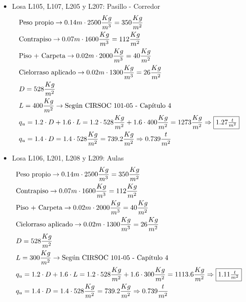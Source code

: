 \begin{enumerate}
\begin{itemize}
\item Losa L105, L107, L205 y L207: Pasillo - Corredor
\begin{align*}
& \text{Peso propio} \rightarrow 0.14m \cdot 2500 \frac{Kg}{m^3} = 350 \frac{Kg}{m^2}\\
& \text{Contrapiso} \rightarrow 0.07m \cdot 1600 \frac{Kg}{m^3} = 112 \frac{Kg}{m^2}\\
& \text{Piso + Carpeta} \rightarrow 0.02m \cdot 2000 \frac{Kg}{m^3} = 40 \frac{Kg}{m^2}\\
& \text{Cielorraso aplicado} \rightarrow  0.02m \cdot 1300 \frac{Kg}{m^3} = 26 \frac{Kg}{m^2}\\
& D = 528 \frac{Kg}{m^2}\\
& L = 400 \frac{Kg}{m^2} \rightarrow \text{Según CIRSOC 101-05 - Capítulo 4}\\
& q_u = 1.2 \cdot D + 1.6 \cdot L = 1.2 \cdot 528 \frac{Kg}{m^2} + 1.6 \cdot 400 \frac{Kg}{m^2} = 1273 \frac{Kg}{m^2} \Rightarrow \framebox{$1.27 \frac{t}{m^2}$} \\
& q_u = 1.4 \cdot D = 1.4 \cdot 528 \frac{Kg}{m^2} = 739.2 \frac{Kg}{m^2} \Rightarrow 0.739 \frac{t}{m^2}
\end{align*}

\item Losa L106, L201, L208 y L209: Aulas
\begin{align*}
& \text{Peso propio} \rightarrow 0.14m \cdot 2500 \frac{Kg}{m^3} = 350 \frac{Kg}{m^2}\\
& \text{Contrapiso} \rightarrow 0.07m \cdot 1600 \frac{Kg}{m^3} = 112 \frac{Kg}{m^2}\\
& \text{Piso + Carpeta} \rightarrow 0.02m \cdot 2000 \frac{Kg}{m^3} = 40 \frac{Kg}{m^2}\\
& \text{Cielorraso aplicado} \rightarrow  0.02m \cdot 1300 \frac{Kg}{m^3} = 26 \frac{Kg}{m^2}\\
& D = 528 \frac{Kg}{m^2}\\
& L = 300 \frac{Kg}{m^2} \rightarrow \text{Según CIRSOC 101-05 - Capítulo 4}\\
& q_u = 1.2 \cdot D + 1.6 \cdot L = 1.2 \cdot 528 \frac{Kg}{m^2} + 1.6 \cdot 300 \frac{Kg}{m^2} = 1113.6 \frac{Kg}{m^2} \Rightarrow \framebox{$1.11 \frac{t}{m^2}$} \\
& q_u = 1.4 \cdot D = 1.4 \cdot 528 \frac{Kg}{m^2} = 739.2 \frac{Kg}{m^2} \Rightarrow 0.739 \frac{t}{m^2}
\end{align*}


\end{itemize}
\end{enumerate}
